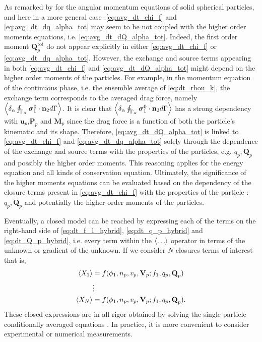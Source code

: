 As remarked by \citet{jackson1997locally} for the angular momentum equations of solid spherical particles, and here in a more general case :\ref{eq:avg_dt_chi_f} and \ref{eq:avg_dt_dq_alpha_tot} may seem to be not coupled with the higher order moments equations, i.e. \ref{eq:avg_dt_dQ_alpha_tot}. 
Indeed, the first order moment $\textbf{Q}_p^\text{tot}$ do not appear explicitly in either \ref{eq:avg_dt_chi_f} or \ref{eq:avg_dt_dq_alpha_tot}.
However, the exchange and source terms 
appearing in both \ref{eq:avg_dt_chi_f} and \ref{eq:avg_dt_dQ_alpha_tot} might depend on the higher order moments of the particles.
For example, in the momentum equation of the continuous phase, i.e. the ensemble average of \ref{eq:dt_rhou_k}, the exchange term corresponds to the averaged drag force, namely $\left<\delta_\alpha \oint_{\Gamma_\alpha} \bm{\sigma}_1^0\cdot \textbf{n}_2 d\Gamma\right>$. 
It is clear that $\left<\delta_\alpha \oint_{\Gamma_\alpha} \bm{\sigma}_1^0\cdot \textbf{n}_2 d\Gamma\right>$ has a strong dependency with $\textbf{u}_p$,$\textbf{P}_p$ and $\textbf{M}_p$ since the drag force is a function of both the particle's kinematic and its shape. 
Therefore, \ref{eq:avg_dt_dQ_alpha_tot} is linked to \ref{eq:avg_dt_chi_f} and \ref{eq:avg_dt_dq_alpha_tot} solely through the dependence of the exchange and source terms with the properties of the particles, e.g. $q_p,\textbf{Q}_p$ and possibly the higher order moments. 
This reasoning applies for the energy equation and all kinds of conservation equation. 
Ultimately, the significance of the higher moments equations can be evaluated based on the dependency of the closure terms present in \ref{eq:avg_dt_chi_f} with the properties of the particle : $q_p, \textbf{Q}_p$ and potentially the higher-order moments of the particles.


Eventually, a closed model can be reached by expressing each of the terms on the right-hand side of \ref{eq:dt_f_1_hybrid}, \ref{eq:dt_q_p_hybrid} and \ref{eq:dt_Q_p_hybrid}, i.e. every term within the $\left<\ldots\right>$ operator in terms of the unknown or gradient of the unknown.
If we consider $N$ closures terms of interest that is, 
\begin{align*}
    \left<X_1\right> &=  f(\phi_1,n_p,v_p,\textbf{V}_p; f_1,q_p,\textbf{Q}_p)\\
    &\vdots\\
    \left<X_N\right> &=  f(\phi_1,n_p,v_p,\textbf{V}_p; f_1,q_p,\textbf{Q}_p). \\
\end{align*}
These closed expressions are in all rigor obtained by solving the single-particle conditionally averaged equations \citet{hinch1977averaged,zhang1994ensemble}.
In practice, it is more convenient to consider experimental or numerical measurements.  


